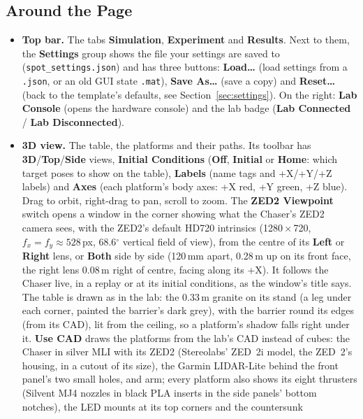 \documentclass[11pt,a4paper]{article}
\newcommand{\ui}[1]{\textsf{\textbf{#1}}}
\newcommand{\pth}[1]{\texttt{#1}}
\begin{document}
\subsection{Around the Page}
\begin{itemize}
  \item \textbf{Top bar.} The tabs \ui{Simulation}, \ui{Experiment} and \ui{Results}. Next to them, the
        \ui{Settings} group shows the file your settings are saved to (\pth{spot\_settings.json}) and has three buttons:
        \ui{Load\ldots} (load settings from a \pth{.json}, or an old GUI state \pth{.mat}), \ui{Save As\ldots}
        (save a copy) and \ui{Reset\ldots} (back to the template's defaults, see Section~\ref{sec:settings}).
        On the right: \ui{Lab Console} (opens the hardware console) and the lab badge (\ui{Lab Connected} /
        \ui{Lab Disconnected}).
  \item \textbf{3D view.} The table, the platforms and their paths. Its toolbar has \ui{3D}/\ui{Top}/\ui{Side} views,
        \ui{Initial Conditions} (\ui{Off}, \ui{Initial} or \ui{Home}: which target poses to show on the table),
        \ui{Labels} (name tags and +X/+Y/+Z labels) and \ui{Axes} (each platform's body axes: +X red, +Y green, +Z blue).
        Drag to orbit, right-drag to pan, scroll to zoom.
        The \ui{ZED2 Viewpoint} switch opens a window in the corner showing what the Chaser's ZED2 camera sees, with the
        ZED2's default HD720 intrinsics (1280\,$\times$\,720, $f_x = f_y \approx 528$\,px, 68.6$^\circ$ vertical field of
        view), from the centre of its \ui{Left} or \ui{Right} lens, or \ui{Both} side by side (120\,mm apart, 0.28\,m up
        on its front face, the right lens 0.08\,m right of centre, facing along its +X). It follows the Chaser live, in a
        replay or at its initial conditions, as the window's title says.
        The table is drawn as in the lab: the 0.33\,m granite on its stand (a leg under each corner, painted the barrier's dark grey), with
        the barrier round its edges (from its CAD), lit from the ceiling, so a platform's shadow falls right under it.
        \ui{Use CAD} draws the platforms from the lab's CAD instead of cubes: the Chaser in silver MLI with its ZED2
        (Stereolabs' ZED~2i model, the ZED~2's housing, in a cutout of its size), the Garmin LIDAR-Lite behind the
        front panel's two small holes, and arm; every platform also shows its eight thrusters (Silvent MJ4 nozzles in
        black PLA inserts in the side panels' bottom notches), the LED mounts at its top corners and the countersunk

\end{itemize}
\end{document}

